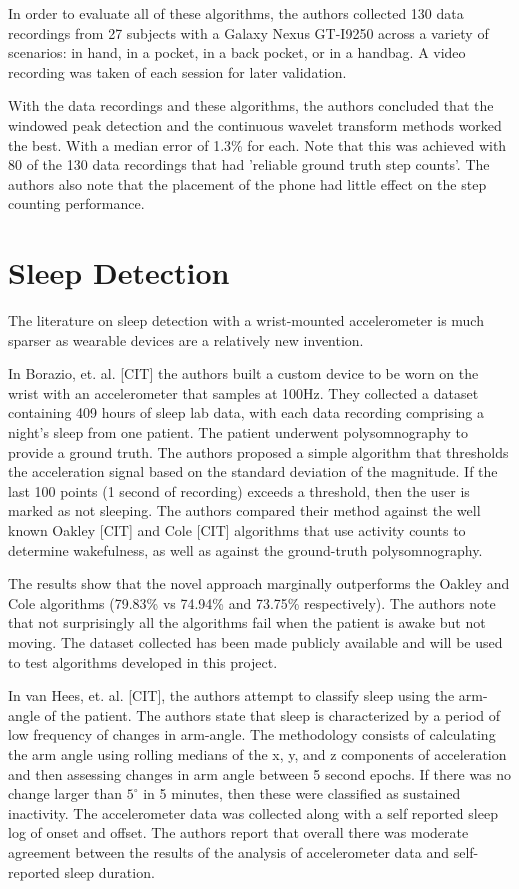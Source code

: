                 In order to evaluate all of these algorithms, the authors collected 130 data recordings from 27 subjects with a Galaxy Nexus GT-I9250 across a variety of scenarios: in hand, in a pocket, in a back pocket, or in a handbag. A video recording was taken of each session for later validation.

                With the data recordings and these algorithms, the authors concluded that the windowed peak detection and the continuous wavelet transform methods worked the best. With a median error of 1.3\% for each. Note that this was achieved with 80 of the 130 data recordings that had 'reliable ground truth step counts'. The authors also note that the placement of the phone had little effect on the step counting performance. 


        \section{Sleep Detection}

            The literature on sleep detection with a wrist-mounted accelerometer is much sparser as wearable devices are a relatively new invention. 

            In Borazio, et. al. [CIT] the authors built a custom device to be worn on the wrist with an accelerometer that samples at 100Hz. They collected a dataset containing 409 hours of sleep lab data, with each data recording comprising a night's sleep from one patient. The patient underwent polysomnography to provide a ground truth. The authors proposed a simple algorithm that thresholds the acceleration signal based on the standard deviation of the magnitude. If the last 100 points (1 second of recording) exceeds a threshold, then the user is marked as not sleeping. The authors compared their method against the well known Oakley [CIT] and Cole [CIT] algorithms that use activity counts to determine wakefulness, as well as against the ground-truth polysomnography. 

            The results show that the novel approach marginally outperforms the Oakley and Cole algorithms (79.83\% vs 74.94\% and 73.75\% respectively). The authors note that not surprisingly all the algorithms fail when the patient is awake but not moving. The dataset collected has been made publicly available and will be used to test algorithms developed in this project.

            In van Hees, et. al. [CIT], the authors attempt to classify sleep using the arm-angle of the patient. The authors state that sleep is characterized by a period of low frequency of changes in arm-angle. The methodology consists of calculating the arm angle using rolling medians of the x, y, and z components of acceleration and then assessing changes in arm angle between 5 second epochs. If there was no change larger than $5^{\circ}$ in 5 minutes, then these were classified as sustained inactivity. The accelerometer data was collected along with a self reported sleep log of onset and offset. The authors report that overall there was moderate agreement between the results of the analysis of accelerometer data and self-reported sleep duration.